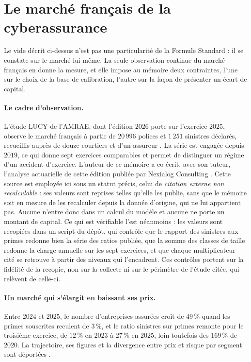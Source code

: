 \section{Le marché français de la cyberassurance}
\label{sec:lucy}

Le vide décrit ci-dessus n'est pas une particularité de la Formule Standard : il se constate sur
le marché lui-même. La seule observation continue du marché français en donne la mesure, et elle
impose au mémoire deux contraintes, l'une sur le choix de la base de calibration, l'autre sur la
façon de présenter un écart de capital.

\paragraph{Le cadre d'observation.} L'étude LUCY de l'AMRAE, dont l'édition $2026$ porte sur
l'exercice $2025$, observe le marché français à partir de $20\,996$ polices et $1\,251$ sinistres
déclarés, recueillis auprès de douze courtiers et d'un assureur \citep{amraeLucy2026}. La série
est engagée depuis $2019$, ce qui donne sept exercices comparables et permet de distinguer un
régime d'un accident d'exercice. L'auteur de ce mémoire a co-écrit, avec son tuteur, l'analyse
actuarielle de cette édition publiée par Nexialog Consulting \citep{RapiorKaddouri2026}. Cette
source est employée ici sous un statut précis, celui de \emph{citation externe non
recalculable} : ses valeurs sont reprises telles qu'elle les publie, sans que le mémoire soit en
mesure de les recalculer depuis la donnée d'origine, qui ne lui appartient pas. Aucune n'entre
donc dans un calcul du modèle et aucune ne porte un montant de capital. Ce qui est vérifiable
l'est néanmoins : les valeurs sont recopiées dans un script du dépôt, qui contrôle que le rapport
des sinistres aux primes redonne bien la série des ratios publiée, que la somme des classes de
taille redonne la charge annuelle sur les sept exercices, et que chaque multiplicateur cité se
retrouve à partir des niveaux qui l'encadrent. Ces contrôles portent sur la fidélité de la
recopie, non sur la collecte ni sur le périmètre de l'étude citée, qui relèvent de celle-ci.

\paragraph{Un marché qui s'élargit en baissant ses prix.} Entre $2024$ et $2025$, le nombre
d'entreprises assurées croît de $49\,\%$ quand les primes souscrites reculent de $3\,\%$, et le
ratio sinistres sur primes remonte pour le troisième exercice, de $12\,\%$ en $2023$ à $27\,\%$
en $2025$, loin toutefois des $169\,\%$ de $2020$. La trajectoire, ses figures et la divergence
entre prix et risque par segment sont déportées \matcomp.

